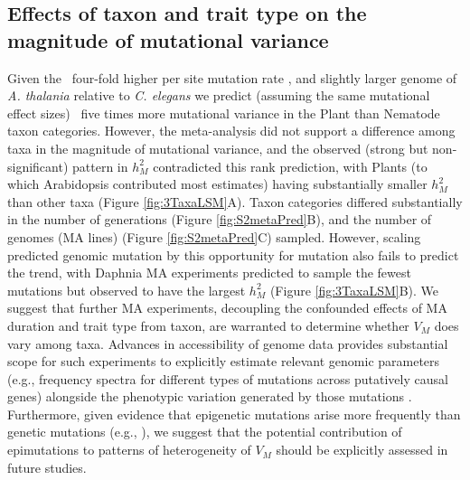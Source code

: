 \subsection{Effects of taxon and trait type on the magnitude of mutational variance }
Given the ~four-fold higher per site mutation rate \citep{Katj19}, and slightly larger genome of \textit{A. thalania} relative to \textit{C. elegans} we predict (assuming the same mutational effect sizes) ~five times more mutational variance in the Plant than Nematode taxon categories. However, the meta-analysis did not support a difference among taxa in the magnitude of mutational variance, and the observed (strong but non-significant) pattern in $h_M^2$ contradicted this rank prediction, with Plants (to which Arabidopsis contributed most estimates) having substantially smaller $h_M^2$ than other taxa (Figure \ref{fig:3TaxaLSM}A). Taxon categories differed substantially in the number of generations (Figure \ref{fig:S2metaPred}B), and the number of genomes (MA lines) (Figure \ref{fig:S2metaPred}C) sampled. However, scaling predicted genomic mutation by this opportunity for mutation also fails to predict the trend, with Daphnia MA experiments predicted to sample the fewest mutations but observed to have the largest $h_M^2$ (Figure \ref{fig:3TaxaLSM}B). We suggest that further MA experiments, decoupling the confounded effects of MA duration and trait type from taxon, are warranted to determine whether $V_M$ does vary among taxa. Advances in accessibility of genome data provides substantial scope for such experiments to explicitly estimate relevant genomic parameters (e.g., frequency spectra for different types of mutations across putatively causal genes) alongside the phenotypic variation generated by those mutations \citep{Katj19}. Furthermore, given evidence that epigenetic mutations arise more frequently than genetic mutations (e.g., \citealp{VanDerGraa15,Belt20}), we suggest that the potential contribution of epimutations to patterns of heterogeneity of $V_M$ should be explicitly assessed in future studies.\par

